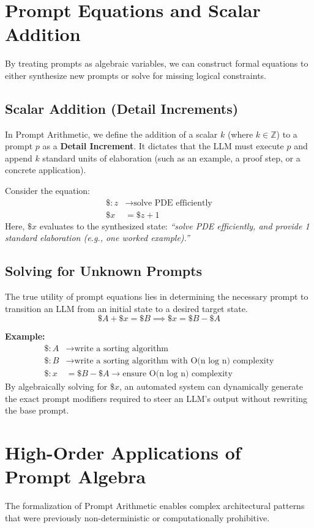 \documentclass[11pt, a4paper]{article}
\begin{document}
\section{Prompt Equations and Scalar Addition}
By treating prompts as algebraic variables, we can construct formal equations to either synthesize new prompts or solve for missing logical constraints.

\subsection{Scalar Addition (Detail Increments)}
In Prompt Arithmetic, we define the addition of a scalar $k$ (where $k \in \mathbb{Z}$) to a prompt $p$ as a \textbf{Detail Increment}. It dictates that the LLM must execute $p$ and append $k$ standard units of elaboration (such as an example, a proof step, or a concrete application).

Consider the equation:
\begin{align*}
    \$: z &\rightarrow \text{solve PDE efficiently} \\
    \$x &= \$z + 1
\end{align*}
Here, $\$x$ evaluates to the synthesized state: \textit{``solve PDE efficiently, and provide 1 standard elaboration (e.g., one worked example).''}

\subsection{Solving for Unknown Prompts}
The true utility of prompt equations lies in determining the necessary prompt to transition an LLM from an initial state to a desired target state. 
$$\$A + \$x = \$B \implies \$x = \$B - \$A$$

\textbf{Example:}
\begin{align*}
    \$: A &\rightarrow \text{write a sorting algorithm} \\
    \$: B &\rightarrow \text{write a sorting algorithm with O(n log n) complexity} \\
    \$: x &= \$B - \$A \rightarrow \text{ensure O(n log n) complexity}
\end{align*}
By algebraically solving for $\$x$, an automated system can dynamically generate the exact prompt modifiers required to steer an LLM's output without rewriting the base prompt.

\section{High-Order Applications of Prompt Algebra}
The formalization of Prompt Arithmetic enables complex architectural patterns that were previously non-deterministic or computationally prohibitive.
\end{document}

